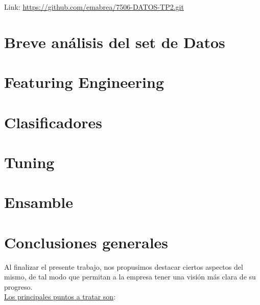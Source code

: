 \documentclass[a4paper ,12pt]{article}
\begin{document}
Link: \url{https://github.com/emabrea/7506-DATOS-TP2.git}

\newpage

\section{Breve análisis del set de Datos}

\newpage

\section{Featuring Engineering}

\newpage


\section{Clasificadores}

\newpage


\section{Tuning}

\newpage


\section{Ensamble}

\newpage

\section{Conclusiones generales}

Al finalizar el presente trabajo, nos propusimos destacar ciertos aspectos del mismo, de tal modo que permitan a la empresa tener una visión más clara de su progreso.\\


\underline{Los principales puntos a tratar son}:
\end{document}
